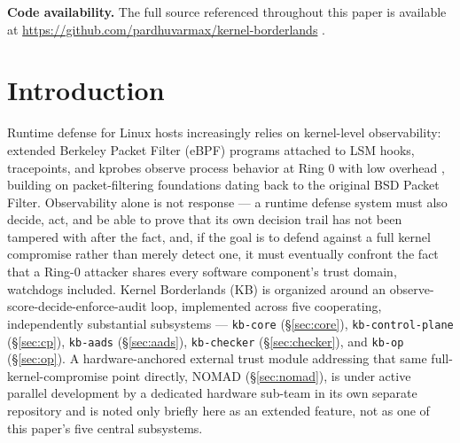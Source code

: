 \documentclass{article}
\begin{document}
\twocolumn


\begin{center}
\small \textbf{Code availability.} The full source referenced
throughout this paper is available at
\url{https://github.com/pardhuvarmax/kernel-borderlands} \citep{kbrepo}.
\end{center}

\section{Introduction}
\label{sec:intro}

Runtime defense for Linux hosts increasingly relies on kernel-level
observability: extended Berkeley Packet Filter (eBPF) programs attached
to LSM hooks, tracepoints, and kprobes observe process behavior at
Ring 0 with low overhead \citep{gregg2019bpf}, building
on packet-filtering foundations dating back to the original BSD Packet
Filter. Observability alone is
not response --- a runtime defense system must also decide, act, and be
able to prove that its own decision trail has not been tampered with
after the fact, and, if the goal is to defend against a full kernel
compromise rather than merely detect one, it must eventually confront
the fact that a Ring-0 attacker shares every software component's trust
domain, watchdogs included. Kernel Borderlands (KB) \citep{kbrepo} is
organized around an observe-score-decide-enforce-audit loop, implemented
across five cooperating, independently substantial subsystems ---
\texttt{kb-core} (\S\ref{sec:core}), \texttt{kb-control-plane}
(\S\ref{sec:cp}), \texttt{kb-aads} (\S\ref{sec:aads}),
\texttt{kb-checker} (\S\ref{sec:checker}), and \texttt{kb-op}
(\S\ref{sec:op}). A hardware-anchored external trust module addressing
that same full-kernel-compromise point directly, NOMAD
(\S\ref{sec:nomad}), is under active parallel development by a
dedicated hardware sub-team in its own separate repository and is
noted only briefly here as an extended feature, not as one of this
paper's five central subsystems.
\end{document}
